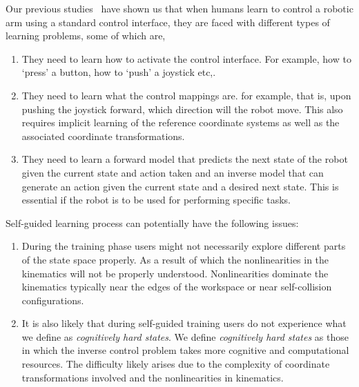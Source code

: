 \documentclass[12pt]{article}
\begin{document}
Our previous studies~\cite{gopinath2017human, gopinath2017mode} have shown us that when humans learn to control a robotic arm using a standard control interface, they are faced with different types of learning problems, some of which are,
\begin{enumerate}
	\item They need to learn how to activate the control interface. For example, how to `press' a button, how to `push' a joystick etc,.
	\item They need to learn what the control mappings are. for example, that is, upon pushing the joystick forward, which direction will the robot move. This also requires implicit learning of the reference coordinate systems as well as the associated coordinate transformations. 
	\item They need to learn a forward model that predicts the next state of the robot given the current state and action taken and an inverse model that can generate an action given the current state and a desired next state. This is essential if the robot is to be used for performing specific tasks. 
\end{enumerate}
Self-guided learning process can potentially have the following issues:
\begin{enumerate}
	\item During the training phase users might not necessarily explore different parts of the state space properly. As a result of which the nonlinearities in the kinematics will not be properly understood. Nonlinearities dominate the kinematics typically near the edges of the workspace or near self-collision configurations. 
	\item It is also likely that during self-guided training users do not experience what we define as \textit{cognitively hard states}. We define \textit{cognitively hard states} as those in which the inverse control problem takes more cognitive and computational resources. The difficulty likely arises due to the complexity of coordinate transformations involved and the nonlinearities in kinematics. 
\end{enumerate}

\end{document}
